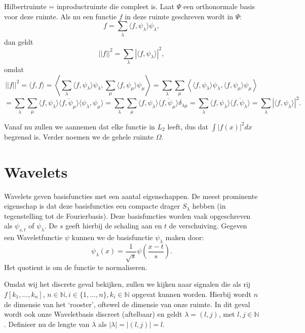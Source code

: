 \documentclass[11pt]{amsart}
\theoremstyle{definition}
\newcommand{\N}{\mathbb{N}}
\begin{document}
\title{}
\author{Jan Westerdiep}
\maketitle


Hilbertruimte = inproductruimte die compleet is. Laat $\Psi$ een orthonormale basis voor deze ruimte. Als nu een functie $f$ in deze ruimte geschreven wordt in $\Psi$:
\[
f = \sum_{\lambda} \langle f, \psi_\lambda \rangle \psi_\lambda,
\]
dan geldt
\[
||f||^2 = \sum_{\lambda} | \langle f, \psi_\lambda \rangle |^2,
\]
omdat
\[
||f||^2 = \langle f, f \rangle = \left\langle \sum_{\lambda} \langle f, \psi_\lambda \rangle \psi_\lambda, \sum_{\mu} \langle f, \psi_\mu \rangle \psi_\mu \right\rangle = \sum_{\lambda} \sum_{\mu} \left\langle \langle f, \psi_\lambda \rangle \psi_\lambda, \langle f, \psi_\mu \rangle \psi_\mu \right \rangle
\]
\[
 = \sum_\lambda \sum_\mu \langle f, \psi_\lambda \rangle \overline{\langle f, \psi_\mu \rangle}\langle \psi_\lambda, \psi_\mu \rangle = \sum_\lambda \sum_\mu \langle f, \psi_\lambda \rangle \overline{\langle f, \psi_\mu \rangle} \delta_{\lambda \mu} = \sum_\lambda \langle f, \psi_\lambda \rangle \overline{\langle f, \psi_\lambda \rangle} = \sum_\lambda |\langle f, \psi_\lambda \rangle |^2.
\]

Vanaf nu zullen we aannemen dat elke functie in $L_2$ leeft, dus dat $\int |f(x)|^2 dx$ begrensd is. Verder noemen we de gehele ruimte $\Omega$.

\section{Wavelets}
Wavelets geven basisfuncties met een aantal eigenschappen. De meest prominente eigenschap is dat deze basisfuncties een compacte drager $S_\lambda$ hebben (in tegenstelling tot de Fourierbasis). Deze basisfuncties worden vaak opgeschreven als $\psi_{s,t}$ of $\psi_\lambda$. De $s$ geeft hierbij de schaling aan en $t$ de verschuiving. Gegeven een Waveletfunctie $\psi$ kunnen we de basisfunctie $\psi_\lambda$ maken door:
\[
	\psi_\lambda(x) = \frac{1}{\sqrt{s}}\psi\left(\frac{x-t}{s}\right).
\]
Het quotient is om de functie te normaliseren.

Omdat wij het discrete geval bekijken, zullen we kijken naar signalen die als rij $f[k_1,\ldots,k_n]$, $n \in \N, i \in \{ 1, \ldots, n \}, k_i \in \N$ opgevat kunnen worden. Hierbij wordt $n$ de dimensie van het `rooster', oftewel de dimensie van onze ruimte. In dit geval wordt ook onze Waveletbasis discreet (aftelbaar) en geldt $\lambda = (l,j)$, met $l,j \in \N$.  Definieer nu de lengte van $\lambda$ als $|\lambda| = |(l,j)| = l$.
\end{document}
